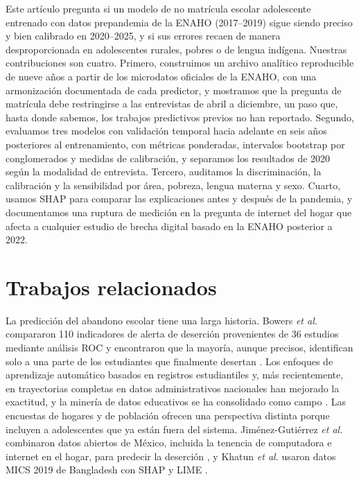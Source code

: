 \documentclass[conference]{IEEEtran}
\begin{document}
Este artículo pregunta si un modelo de no matrícula escolar adolescente entrenado con datos prepandemia de la ENAHO (2017--2019) sigue siendo preciso y bien calibrado en 2020--2025, y si sus errores recaen de manera desproporcionada en adolescentes rurales, pobres o de lengua indígena. Nuestras contribuciones son cuatro. Primero, construimos un archivo analítico reproducible de nueve años a partir de los microdatos oficiales de la ENAHO, con una armonización documentada de cada predictor, y mostramos que la pregunta de matrícula debe restringirse a las entrevistas de abril a diciembre, un paso que, hasta donde sabemos, los trabajos predictivos previos no han reportado. Segundo, evaluamos tres modelos con validación temporal hacia adelante en seis años posteriores al entrenamiento, con métricas ponderadas, intervalos bootstrap por conglomerados y medidas de calibración, y separamos los resultados de 2020 según la modalidad de entrevista. Tercero, auditamos la discriminación, la calibración y la sensibilidad por área, pobreza, lengua materna y sexo. Cuarto, usamos SHAP para comparar las explicaciones antes y después de la pandemia, y documentamos una ruptura de medición en la pregunta de internet del hogar que afecta a cualquier estudio de brecha digital basado en la ENAHO posterior a 2022.

\section{Trabajos relacionados}

La predicción del abandono escolar tiene una larga historia. Bowers \textit{et al.} compararon 110 indicadores de alerta de deserción provenientes de 36 estudios mediante análisis ROC y encontraron que la mayoría, aunque precisos, identifican solo a una parte de los estudiantes que finalmente desertan \cite{bowers2013}. Los enfoques de aprendizaje automático basados en registros estudiantiles \cite{lakkaraju2015,sansone2019} y, más recientemente, en trayectorias completas en datos administrativos nacionales \cite{rodriguez2023} han mejorado la exactitud, y la minería de datos educativos se ha consolidado como campo \cite{romero2020}. Las encuestas de hogares y de población ofrecen una perspectiva distinta porque incluyen a adolescentes que ya están fuera del sistema. Jiménez-Gutiérrez \textit{et al.} combinaron datos abiertos de México, incluida la tenencia de computadora e internet en el hogar, para predecir la deserción \cite{jimenez2024}, y Khatun \textit{et al.} usaron datos MICS 2019 de Bangladesh con SHAP y LIME \cite{khatun2025}.
\end{document}
